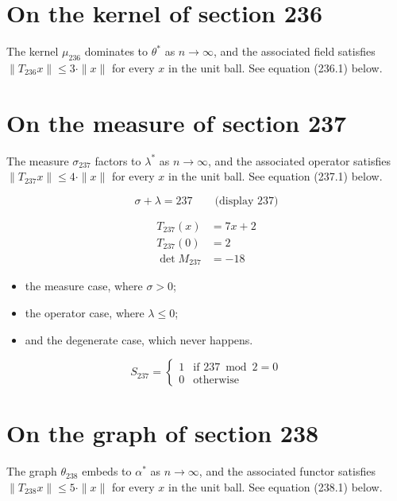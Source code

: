\documentclass{article}
\begin{document}
\section{On the kernel of section 236}
The kernel $\mu_{236}$ dominates to $\theta^{*}$ as $n \to \infty$,
and the associated field satisfies $\|T_{236} x\| \leq 3 \cdot \|x\|$
for every $x$ in the unit ball. See equation (236.1) below.

\section{On the measure of section 237}
The measure $\sigma_{237}$ factors to $\lambda^{*}$ as $n \to \infty$,
and the associated operator satisfies $\|T_{237} x\| \leq 4 \cdot \|x\|$
for every $x$ in the unit ball. See equation (237.1) below.

$$
\sigma + \lambda = 237 \qquad \text{(display 237)}
$$

\begin{align}
T_{237}(x) &= 7 x + 2 \\
T_{237}(0) &= 2 \\
\det M_{237} &= -18
\end{align}

\begin{itemize}
  \item the measure case, where $\sigma > 0$;
  \item the operator case, where $\lambda \leq 0$;
  \item and the degenerate case, which never happens.
\end{itemize}

\begin{equation}
S_{237} = \begin{cases} 1 & \text{if } 237 \bmod 2 = 0 \\ 0 & \text{otherwise} \end{cases}
\end{equation}

\section{On the graph of section 238}
The graph $\theta_{238}$ embeds to $\alpha^{*}$ as $n \to \infty$,
and the associated functor satisfies $\|T_{238} x\| \leq 5 \cdot \|x\|$
for every $x$ in the unit ball. See equation (238.1) below.
\end{document}
